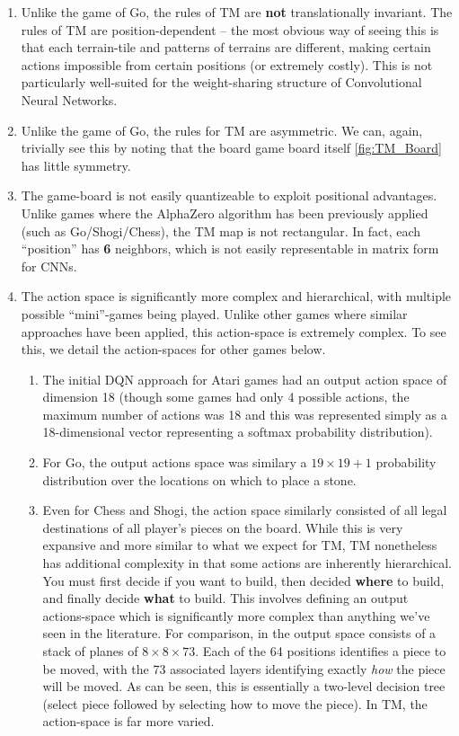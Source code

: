 \documentclass[8pt,twocolumn]{article}
\begin{document}
\begin{enumerate}
    \item Unlike the game of Go, the rules of TM are \textbf{not} translationally invariant. The rules of TM are position-dependent -- the most obvious way of seeing this is that each terrain-tile and patterns of terrains are different, making certain actions impossible from certain positions (or extremely costly). This is not particularly well-suited for the weight-sharing structure of Convolutional Neural Networks.
    \item Unlike the game of Go, the rules for TM are asymmetric. We can, again, trivially see this by noting that the board game board itself \ref{fig:TM_Board} has little symmetry.
    \item The game-board is not easily quantizeable to exploit positional advantages. Unlike games where the AlphaZero algorithm has been previously applied (such as Go/Shogi/Chess), the TM map is not rectangular. In fact, each ``position'' has \textbf{6} neighbors, which is not easily representable in matrix form for CNNs.
    \item The action space is significantly more complex and hierarchical, with multiple possible ``mini''-games being played. Unlike other games where similar approaches have been applied, this action-space is extremely complex. To see this, we detail the action-spaces for other games below.
    \begin{enumerate}
        \item The initial DQN approach for Atari games had an output action space of dimension 18 (though some games had only 4 possible actions, the maximum number of actions was 18 and this was represented simply as a 18-dimensional vector representing a softmax
        probability distribution).
        \item For Go, the output actions space was similary a $19\times19 + 1$ probability distribution over the locations on which to place a stone. 
        \item Even for Chess and Shogi, the action space similarly consisted of all legal destinations of all player's pieces on the board. While this is very expansive and more similar to what we expect for TM, TM nonetheless has additional complexity in that some actions are inherently hierarchical. You must first decide if you want to build, then decided \textbf{where} to build, and finally decide \textbf{what} to build. This involves defining an output actions-space which is significantly more complex than anything we've seen in the literature. For comparison, in \cite{AlphaZero} the output space consists of a stack of planes of $8\times 8 \times 73$. Each of the 64 positions identifies a piece to be moved, with the 73 associated layers identifying exactly \textit{how} the piece will be moved. As can be seen, this is essentially a two-level decision tree (select piece followed by selecting how to move the piece). In TM, the action-space is far more varied.

\end{enumerate}
\end{enumerate}
\end{document}
